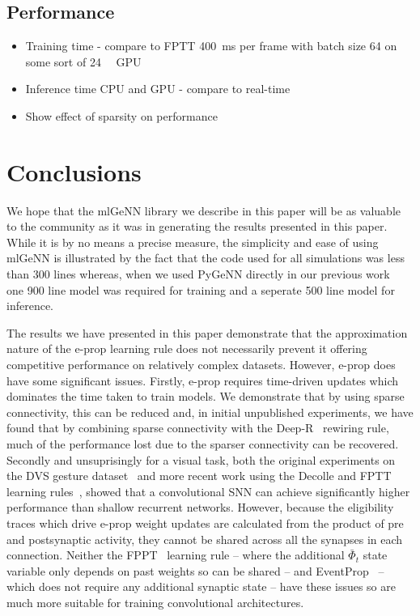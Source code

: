 \documentclass[sigconf]{acmart}
\begin{document}
\subsection{Performance}
\begin{itemize}
    \item Training time - compare to FPTT \SI{400}{\milli\second} per frame with batch size 64 on some sort of \SI{24}{\giga\byte} GPU
    \item Inference time CPU and GPU - compare to real-time
    \item Show effect of sparsity on performance
\end{itemize}

\section{Conclusions}
We hope that the mlGeNN library we describe in this paper will be as valuable to the community as it was in generating the results presented in this paper.
While it is by no means a precise measure, the simplicity and ease of using mlGeNN is illustrated by the fact that the code used for all simulations was less than \num{300} lines whereas, when we used PyGeNN directly in our previous work~\citep{Knight2022} one \num{900} line model was required for training and a seperate \num{500} line model for inference.

The results we have presented in this paper demonstrate that the approximation nature of the e-prop learning rule does not necessarily prevent it offering competitive performance on relatively complex datasets.
However, e-prop does have some significant issues.
Firstly, e-prop requires time-driven updates which dominates the time taken to train models.
We demonstrate that by using sparse connectivity, this can be reduced and, in initial unpublished experiments, we have found that by combining sparse connectivity with the Deep-R~\citep{Bellec2018a} rewiring rule, much of the performance lost due to the sparser connectivity can be recovered.
Secondly and unsuprisingly for a visual task, both the original experiments on the DVS gesture dataset~\citep{amir_low_2017} and more recent work using the Decolle and FPTT learning rules~\citep{Kaiser2020,yin2021accurate}, showed that a convolutional SNN can achieve significantly higher performance than shallow recurrent networks.
However, because the eligibility traces which drive e-prop weight updates are calculated from the product of pre and postsynaptic activity, they cannot be shared across all the synapses in each connection.
Neither the FPPT~\citep{yin2021accurate} learning rule -- where the additional $\bar{\Phi}_t$ state variable only depends on past weights so can be shared -- and EventProp~\citep{Wunderlich2021} -- which does not require any additional synaptic state -- have these issues so are much more suitable for training convolutional architectures.
\end{document}
